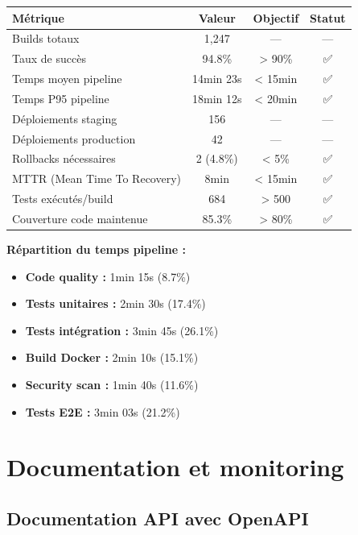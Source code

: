 \begin{tcolorbox}[colback=blue!5!white,colframe=blue!60!black,title=\textbf{Statistiques CI/CD (Q4 2024)}]
\begin{center}
\begin{tabular}{|l|c|c|c|}
\hline
\textbf{Métrique} & \textbf{Valeur} & \textbf{Objectif} & \textbf{Statut} \\
\hline
Builds totaux & 1,247 & --- & --- \\
Taux de succès & 94.8\% & > 90\% & ✅ \\
Temps moyen pipeline & 14min 23s & < 15min & ✅ \\
Temps P95 pipeline & 18min 12s & < 20min & ✅ \\
Déploiements staging & 156 & --- & --- \\
Déploiements production & 42 & --- & --- \\
Rollbacks nécessaires & 2 (4.8\%) & < 5\% & ✅ \\
MTTR (Mean Time To Recovery) & 8min & < 15min & ✅ \\
Tests exécutés/build & 684 & > 500 & ✅ \\
Couverture code maintenue & 85.3\% & > 80\% & ✅ \\
\hline
\end{tabular}
\end{center}

\textbf{Répartition du temps pipeline :}
\begin{itemize}
    \item \textbf{Code quality :} 1min 15s (8.7\%)
    \item \textbf{Tests unitaires :} 2min 30s (17.4\%)
    \item \textbf{Tests intégration :} 3min 45s (26.1\%)
    \item \textbf{Build Docker :} 2min 10s (15.1\%)
    \item \textbf{Security scan :} 1min 40s (11.6\%)
    \item \textbf{Tests E2E :} 3min 03s (21.2\%)
\end{itemize}
\end{tcolorbox}

\section{Documentation et monitoring}

\subsection{Documentation API avec OpenAPI}

